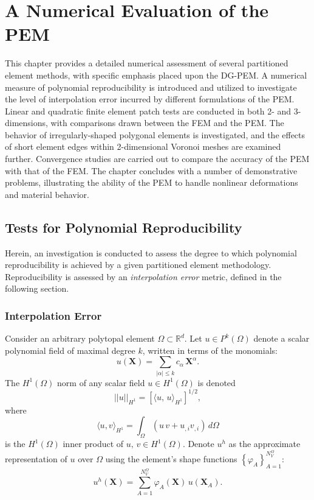 \chapter{A Numerical Evaluation of the PEM} \label{ch:results}
%
This chapter provides a detailed numerical assessment of several partitioned element methods, with specific emphasis placed upon the DG-PEM. A numerical measure of polynomial reproducibility is introduced and utilized to investigate the level of interpolation error incurred by different formulations of the PEM. Linear and quadratic finite element patch tests are conducted in both 2- and 3-dimensions, with comparisons drawn between the FEM and the PEM. The behavior of irregularly-shaped polygonal elements is investigated, and the effects of short element edges within 2-dimensional Voronoi meshes are examined further. Convergence studies are carried out to compare the accuracy of the PEM with that of the FEM. The chapter concludes with a number of demonstrative problems, illustrating the ability of the PEM to handle nonlinear deformations and material behavior.

\section{Tests for Polynomial Reproducibility}

Herein, an investigation is conducted to assess the degree to which polynomial reproducibility is achieved by a given partitioned element methodology. Reproducibility is assessed by an \textit{interpolation error} metric, defined in the following section.

\subsection*{Interpolation Error}

Consider an arbitrary polytopal element $\Omega \subset \mathbb{R}^d$. Let $u \in P^k (\Omega)$ denote a scalar polynomial field of maximal degree $k$, written in terms of the monomials:
\begin{equation}
        u (\mathbf{X}) = \sum_{|\alpha| \leq k} c_{\alpha} \, \mathbf{X}^{\alpha}.
\end{equation}
The $H^1(\Omega)$ norm of any scalar field $u \in H^1(\Omega)$ is denoted
\begin{equation}
        ||u||_{H^1} = \left[ \langle u, \, u \rangle_{H^1} \right]^{1/2},
\end{equation}
where
\begin{equation}
       \langle u,v \rangle_{H^1} = \int_{\Omega} (u \, v + u_{,i} v_{,i}) \, d\Omega
\end{equation}
is the $H^1(\Omega)$ inner product of $u, \,v \in H^1(\Omega)$. Denote $u^h$ as the approximate representation of $u$ over $\Omega$ using the element's shape functions $\left\{ \varphi_A \right\}_{A=1}^{N^\Omega_V}$:
\begin{equation}
        u^h (\mathbf{X}) = \sum_{A = 1}^{N^{\Omega}_V} \varphi_A (\mathbf{X}) \, u(\mathbf{X}_A).
\end{equation}

